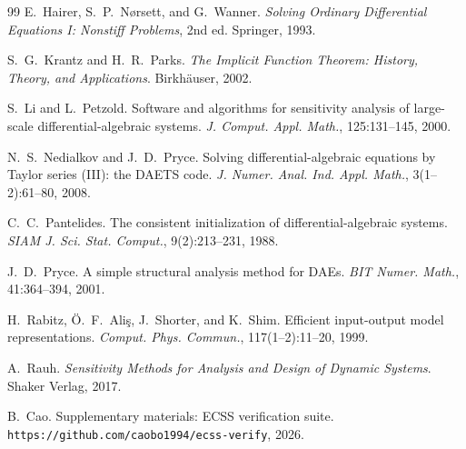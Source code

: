 \documentclass[12pt,a4paper]{article}
\theoremstyle{definition}
\theoremstyle{plain}
\theoremstyle{remark}
\begin{document}
\begin{thebibliography}{99}
E.\ Hairer, S.\ P.\ N{\o}rsett, and G.\ Wanner.
\textit{Solving Ordinary Differential Equations I: Nonstiff Problems}, 2nd ed.
Springer, 1993.

S.\ G.\ Krantz and H.\ R.\ Parks.
\textit{The Implicit Function Theorem: History, Theory, and Applications}.
Birkh\"{a}user, 2002.

S.\ Li and L.\ Petzold.
Software and algorithms for sensitivity analysis of large-scale differential-algebraic systems.
\textit{J. Comput. Appl. Math.}, 125:131--145, 2000.

N.\ S.\ Nedialkov and J.\ D.\ Pryce.
Solving differential-algebraic equations by Taylor series (III): the DAETS code.
\textit{J. Numer. Anal. Ind. Appl. Math.}, 3(1--2):61--80, 2008.

C.\ C.\ Pantelides.
The consistent initialization of differential-algebraic systems.
\textit{SIAM J. Sci. Stat. Comput.}, 9(2):213--231, 1988.

J.\ D.\ Pryce.
A simple structural analysis method for DAEs.
\textit{BIT Numer. Math.}, 41:364--394, 2001.

H.\ Rabitz, \"{O}.\ F.\ Ali\c{s}, J.\ Shorter, and K.\ Shim.
Efficient input-output model representations.
\textit{Comput. Phys. Commun.}, 117(1--2):11--20, 1999.

A.\ Rauh.
\textit{Sensitivity Methods for Analysis and Design of Dynamic Systems}.
Shaker Verlag, 2017.

B.\ Cao.
Supplementary materials: ECSS verification suite.\\
\texttt{https://github.com/caobo1994/ecss-verify}, 2026.

\end{thebibliography}
\end{document}
